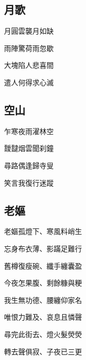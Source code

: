 \documentclass[a4j,12pt]{ltjtarticle}
\begin{document}
	\newpage
	\begin{center}
	
		\begin{flushleft}
			\section{月歌} 
		\end{flushleft}
		
		
		
		\vfill
		\LARGE 	月圓雲襲月如缺 \par
		 		雨陣驚荷雨忽歇 \par
		 		大塊陷人悲喜間 \par
		 		遣人何得求心滅 \par
		\vspace{1cm} %
		\vfill
		
	\newpage
		\begin{flushleft}
			\section{空山}
		\end{flushleft}
		
		\vfill
		\LARGE 	乍寒夜雨濯林空 \par
				靉靆烟雲聞刹鐘 \par
				尋路偶逢歸寺叟 \par
				笑言我復行迷蹤 \par
		\vspace{0.5cm} %
		\vfill
		
		
	\newpage
	
		\begin{flushleft}
			\section{老嫗} 
		\end{flushleft}
		
		\vfill
		\LARGE 	老嫗孤燈下、寒風料峭生 \par
		忘身布衣薄、影蹣足難行 \par
		舊樽復瘦碗、纖手纏囊盈\par
		今夜怎果腹、剩餘糠與粳\par
		我生無功德、腰纏仰家名\par
		唯恨力難及、哀息且憐聲\par
		尋完此街去、燈火髮熒熒\par
		轉去聲俱寂、子夜已三更\par
		\vspace{1.5cm} %
		\vfill
		

\end{center}
\end{document}
